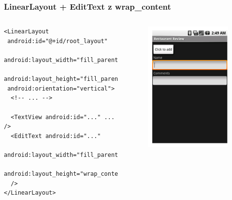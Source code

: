 \documentclass{beamer}
\begin{document}
\begin{frame}[fragile]\frametitle{LinearLayout + EditText z wrap\_content}
 \begin{columns}
  \begin{verbatim}
<LinearLayout
 android:id="@+id/root_layout"
 android:layout_width="fill_parent"
 android:layout_height="fill_parent"
 android:orientation="vertical">
  <!-- ... -->

  <TextView android:id="..." ... />
  <EditText android:id="..."
   android:layout_width="fill_parent"
   android:layout_height="wrap_content" 
  />
</LinearLayout>

  \end{verbatim}
  \begin{figure}
   \includegraphics[width=.7\textwidth]{images/linearlayout_wrap}   
  \end{figure}

 \end{columns}
\end{frame}
\end{document}
